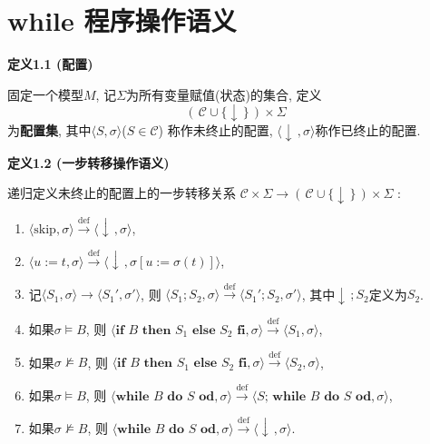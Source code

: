 \documentclass[UTF8]{ctexart}
\begin{document}
\setlength{\abovedisplayskip}{1pt}
\setlength{\belowdisplayskip}{1pt}

\section{while 程序操作语义}

\hypertarget{sec:定义1.1}{}
\noindent\textbf{定义1.1 (配置)}

固定一个模型$M$, 记$\Sigma$为所有变量赋值(状态)的集合, 定义
\[
    (\,\mathcal{C}\cup\{\downarrow\,\}\,)\times\Sigma
\]
为\textbf{配置集}, 其中$\langle S,\sigma\rangle$($S\in\mathcal{C}$)
称作未终止的配置, $\langle\downarrow\,,\sigma\rangle$称作已终止的配置.

\vspace{10pt}

\hypertarget{sec:定义1.2}{}
\noindent\textbf{定义1.2 (一步转移操作语义)}

递归定义未终止的配置上的一步转移关系
\vspace{3pt}
$\mathcal{C}\times\Sigma\to(\,\mathcal{C}\cup\{\downarrow\,\}\,)\times\Sigma$ :
\begin{enumerate}
    \item $\langle\mathrm{skip},\sigma\rangle\overset{\mathrm{def}}{\to}
    \langle\downarrow\,,\sigma\rangle$,
    \item $\langle u:=t,\sigma\rangle\overset{\mathrm{def}}{\to}
    \langle\downarrow\,,\sigma[u:=\sigma(t)]\rangle$,
    \item 记$\langle S_1,\sigma\rangle\to\langle S_1',\sigma'\rangle$, 则
    $\langle S_1;S_2,\sigma\rangle\overset{\mathrm{def}}{\to}
    \langle S_1';S_2,\sigma'\rangle$, 其中$\downarrow\,;S_2$定义为$S_2$.
    \item 如果$\sigma\models B$, 则
    $\langle\mathbf{if}\,\,B\,\,\mathbf{then}\,\,S_1\,\,\mathbf{else}\,\,S_2
    \,\,\mathbf{fi},\sigma\rangle\overset{\mathrm{def}}{\to}
    \langle S_1,\sigma\rangle$,
    \item 如果$\sigma\not\models B$, 则
    $\langle\mathbf{if}\,\,B\,\,\mathbf{then}\,\,S_1\,\,\mathbf{else}\,\,S_2
    \,\,\mathbf{fi},\sigma\rangle\overset{\mathrm{def}}{\to}
    \langle S_2,\sigma\rangle$,
    \item 如果$\sigma\models B$, 则
    $\langle\mathbf{while}\,\,B\,\,\mathbf{do}\,\,S\,\,\mathbf{od},\sigma\rangle
    \overset{\mathrm{def}}{\to}\langle S;
    \,\mathbf{while}\,\,B\,\,\mathbf{do}\,\,S\,\,\mathbf{od},\sigma\rangle$,
    \item 如果$\sigma\not\models B$, 则
    $\langle\mathbf{while}\,\,B\,\,\mathbf{do}\,\,S\,\,\mathbf{od},\sigma\rangle
    \overset{\mathrm{def}}{\to}\langle\downarrow\,,\sigma\rangle$.
\end{enumerate}
\end{document}
